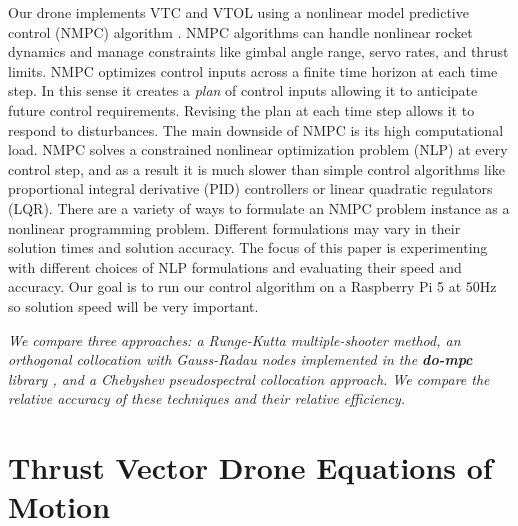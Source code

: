 \documentclass[]{article}
\begin{document}
	Our drone implements VTC and VTOL using a nonlinear model predictive control (NMPC) algorithm \citep{nmpc}.
	NMPC algorithms can handle nonlinear rocket dynamics and manage constraints like gimbal angle range, servo rates, and thrust limits. NMPC optimizes control inputs across a finite time horizon at each time step. In this sense it creates a {\em plan} of control inputs allowing it to anticipate future control requirements. Revising the plan at each time step allows it to respond to disturbances. The main downside of NMPC is its high computational load. NMPC solves a constrained nonlinear optimization  problem (NLP) at every control step, and as a result it is much slower than simple control algorithms like proportional integral derivative (PID) controllers or linear quadratic regulators (LQR).
	There are a variety of ways to formulate an NMPC problem instance as a nonlinear programming problem. Different formulations may vary in their solution times and solution accuracy.
	The  focus of this paper is experimenting with different choices of NLP formulations and evaluating their speed and accuracy.  Our goal is to run our control algorithm on a Raspberry Pi 5 at $50$Hz so solution speed will be very important.  
	
	{\em We  compare three approaches: a Runge-Kutta multiple-shooter method, an orthogonal collocation with Gauss-Radau nodes implemented in the {\bf do-mpc}  library \citep{do-mpc},  and a Chebyshev pseudospectral collocation approach. We compare the relative accuracy of these techniques and their relative efficiency.}

	

	
\section*{Thrust Vector Drone Equations of Motion}
	
\end{document}
